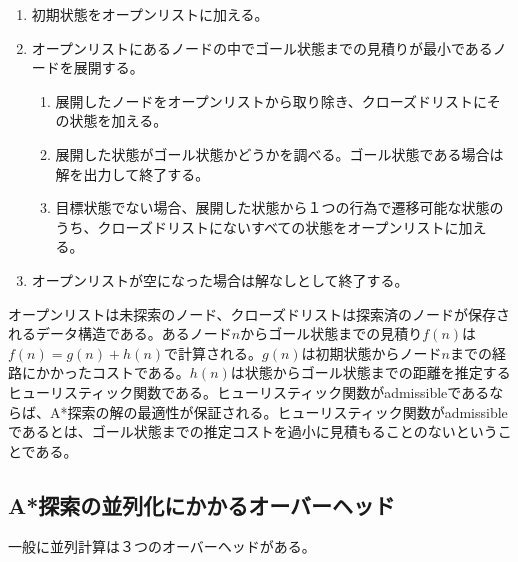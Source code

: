 \documentclass{jsarticle}
\begin{document}
\begin{enumerate}
	\item 初期状態をオープンリストに加える。
	\item オープンリストにあるノードの中でゴール状態までの見積りが最小であるノードを展開する。
	\begin{enumerate}
		\item 展開したノードをオープンリストから取り除き、クローズドリストにその状態を加える。
		\item 展開した状態がゴール状態かどうかを調べる。ゴール状態である場合は解を出力して終了する。
		\item 目標状態でない場合、展開した状態から１つの行為で遷移可能な状態のうち、クローズドリストにないすべての状態をオープンリストに加える。
	\end{enumerate}
	\item オープンリストが空になった場合は解なしとして終了する。
\end{enumerate}

オープンリストは未探索のノード、クローズドリストは探索済のノードが保存されるデータ構造である。あるノード$n$からゴール状態までの見積り$f(n)$は$f(n) = g(n) + h(n)$で計算される。$g(n)$は初期状態からノード$n$までの経路にかかったコストである。$h(n)$は状態からゴール状態までの距離を推定するヒューリスティック関数である。ヒューリスティック関数がadmissibleであるならば、A*探索の解の最適性が保証される。ヒューリスティック関数がadmissibleであるとは、ゴール状態までの推定コストを過小に見積もることのないということである。


\subsection{A*探索の並列化にかかるオーバーヘッド}

一般に並列計算は３つのオーバーヘッドがある。
\end{document}
